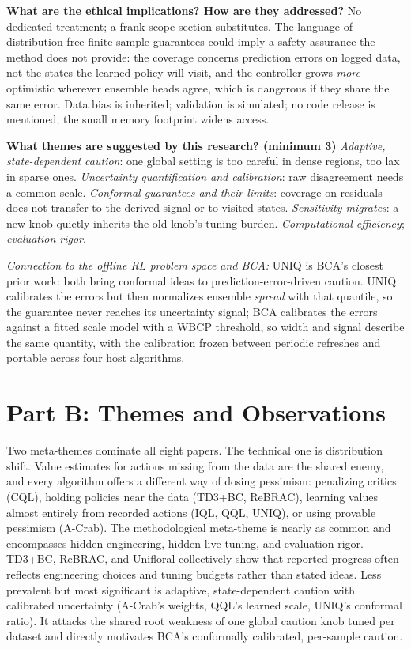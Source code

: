 \documentclass[11pt]{article}
\newcommand{\q}[2]{\item \textbf{#1} #2}
\newcommand{\tiein}[1]{\par\smallskip\noindent\emph{Connection to the offline RL problem space and BCA:} #1\par\medskip}
\begin{document}
\begin{qna}
\q{What are the ethical implications? How are they addressed?}
No dedicated treatment; a frank scope section substitutes. The language of distribution-free finite-sample guarantees could imply a safety assurance the method does not provide: the coverage concerns prediction errors on logged data, not the states the learned policy will visit, and the controller grows \emph{more} optimistic wherever ensemble heads agree, which is dangerous if they share the same error. Data bias is inherited; validation is simulated; no code release is mentioned; the small memory footprint widens access.

\q{What themes are suggested by this research? (minimum 3)}
\emph{Adaptive, state-dependent caution}: one global setting is too careful in dense regions, too lax in sparse ones. \emph{Uncertainty quantification and calibration}: raw disagreement needs a common scale. \emph{Conformal guarantees and their limits}: coverage on residuals does not transfer to the derived signal or to visited states. \emph{Sensitivity migrates}: a new knob quietly inherits the old knob's tuning burden. \emph{Computational efficiency}; \emph{evaluation rigor}.

\end{qna}
\tiein{UNIQ is BCA's closest prior work: both bring conformal ideas to prediction-error-driven caution. UNIQ calibrates the errors but then normalizes ensemble \emph{spread} with that quantile, so the guarantee never reaches its uncertainty signal; BCA calibrates the errors against a fitted scale model with a WBCP threshold, so width and signal describe the same quantity, with the calibration frozen between periodic refreshes and portable across four host algorithms.}

\section*{Part B: Themes and Observations}

Two meta-themes dominate all eight papers. The technical one is distribution shift. Value estimates for actions missing from the data are the shared enemy, and every algorithm offers a different way of dosing pessimism: penalizing critics (CQL), holding policies near the data (TD3+BC, ReBRAC), learning values almost entirely from recorded actions (IQL, QQL, UNIQ), or using provable pessimism (A-Crab). The methodological meta-theme is nearly as common and encompasses hidden engineering, hidden live tuning, and evaluation rigor. TD3+BC, ReBRAC, and Unifloral collectively show that reported progress often reflects engineering choices and tuning budgets rather than stated ideas. Less prevalent but most significant is adaptive, state-dependent caution with calibrated uncertainty (A-Crab's weights, QQL's learned scale, UNIQ's conformal ratio). It attacks the shared root weakness of one global caution knob tuned per dataset and directly motivates BCA's conformally calibrated, per-sample caution.
\end{document}
